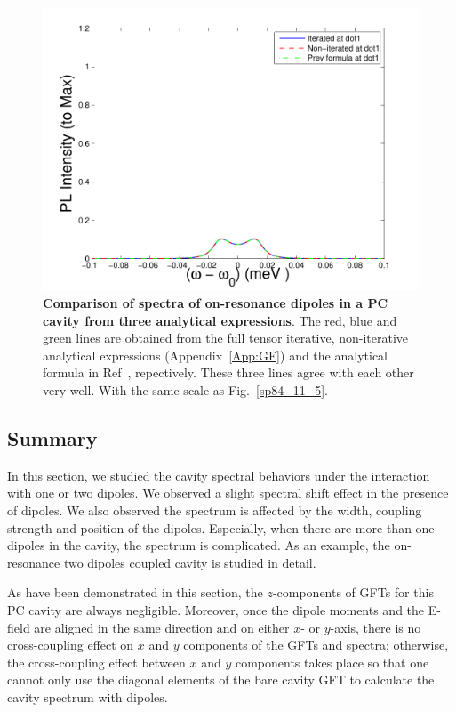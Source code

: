 \begin{figure}[H]
\centering
\begin{center}
\includegraphics[width=14cm]{./Figs/sp84_11_6}
\end{center}
\caption[Spectra of on-resonance dots, based on three analytical expressions.]{\textbf{Comparison of spectra of on-resonance dipoles in a PC cavity from three analytical expressions}. The red, blue and green lines are obtained from the full tensor iterative, non-iterative analytical expressions (Appendix~\ref{App:GF}) and the analytical formula in Ref~\cite{Yao2009c}, repectively. These three lines agree with each other very well. With the same scale as Fig.~\ref{sp84_11_5}.}
\label{sp84_11_6}
\end{figure}

\subsection{Summary}
In this section, we studied the cavity spectral behaviors under the interaction with one or two dipoles. We observed a slight spectral shift effect in the presence of dipoles. We also observed the spectrum is affected by the width, coupling strength and position of the dipoles. Especially, when there are more than one dipoles in the cavity, the spectrum is complicated. As an example, the on-resonance two dipoles coupled cavity is studied in detail.

As have been demonstrated in this section, the $z$-components of GFTs for this PC cavity are always negligible. Moreover, once the dipole moments and the E-field are aligned in the same direction and on either $x$- or $y$-axis, there is no cross-coupling effect on $x$ and $y$ components of the GFTs and spectra; otherwise, the cross-coupling effect between $x$ and $y$ components takes place so that one cannot only use the diagonal elements of the bare cavity GFT to calculate the cavity spectrum with dipoles.

